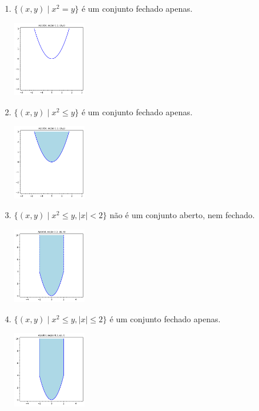 \documentclass[../main.tex]{subfiles}
\begin{document}
\begin{solucao}
\begin{enumerate}[label=\alph*)]
\begin{center}
					\captionof{figure}{$x\in [1,2], y\in [3,4)$}
				\end{center}
				\item $\{(x,y) \mid x^2=y\}$ é um conjunto fechado apenas.
				\begin{center}
					\includegraphics[width=0.25\textwidth]{imagens/lista03/picture_lista03.02_q03_item09.png}
				\end{center}
				\item $\{(x,y) \mid x^2\leq y\}$ é um conjunto fechado apenas.
				\begin{center}
					\includegraphics[width=0.25\textwidth]{imagens/lista03/picture_lista03.02_q03_item10.png}
				\end{center}
				\item $\{(x,y) \mid x^2\leq y, |x|<2\}$ não é um conjunto aberto, nem fechado.
				\begin{center}
					\includegraphics[width=0.25\textwidth]{imagens/lista03/picture_lista03.02_q03_item11.png}
				\end{center}
				\item $\{(x,y) \mid x^2\leq y, |x|\leq 2\}$ é um conjunto fechado apenas.
				\begin{center}
					\includegraphics[width=0.25\textwidth]{imagens/lista03/picture_lista03.02_q03_item12.png}
				\end{center}
			\end{enumerate}
		\end{solucao}
		
\end{document}
